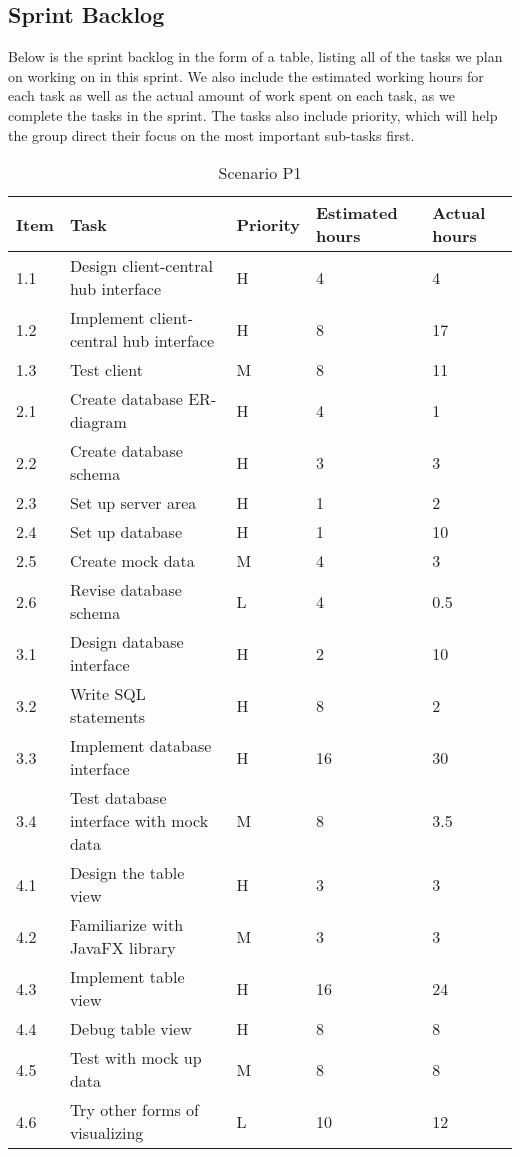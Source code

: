 \documentclass[../document.tex]{subfiles}
\begin{document}
\subsection{Sprint Backlog}
Below is the sprint backlog in the form of a table, listing all of the tasks we plan on working on in this sprint. We also include the estimated working hours for each task as well as the actual amount of work spent on each task, as we complete the tasks in the sprint. The tasks also include priority, which will help the group direct their focus on the most important sub-tasks first.


\begin{table}[H]
\caption{Scenario P1}
\begin{tabularx}{\textwidth}{|l|X|l|l|l|}
\hline
Item
&Task
&Priority
&Estimated hours
&Actual hours
\\ \hline1.1
&Design client-central hub interface
&H
&4
&4
\\ \hline1.2
&Implement client-central hub interface
&H
&8
&17
\\ \hline1.3
&Test client
&M
&8
&11
\\ \hline2.1
&Create database ER-diagram
&H
&4
&1
\\ \hline2.2
&Create database schema
&H
&3
&3
\\ \hline2.3
&Set up server area
&H
&1
&2
\\ \hline2.4
&Set up database
&H
&1
&10
\\ \hline2.5
&Create mock data
&M
&4
&3
\\ \hline2.6
&Revise database schema
&L
&4
&0.5
\\ \hline3.1
&Design database interface
&H
&2
&10
\\ \hline3.2
&Write \gls{SQL} statements
&H
&8
&2
\\ \hline3.3
&Implement database interface
&H
&16
&30
\\ \hline3.4
&Test database interface with mock data
&M
&8
&3.5
\\ \hline4.1
&Design the table view
&H
&3
&3
\\ \hline4.2
&Familiarize with \gls{JavaFX} library
&M
&3
&3
\\ \hline4.3
&Implement table view
&H
&16
&24
\\ \hline4.4
&Debug table view
&H
&8
&8
\\ \hline4.5
&Test with mock up data
&M
&8
&8
\\ \hline4.6
&Try other forms of visualizing
&L
&10
&12
\\ \hline
\end{tabularx}
\end{table}
\end{document}
